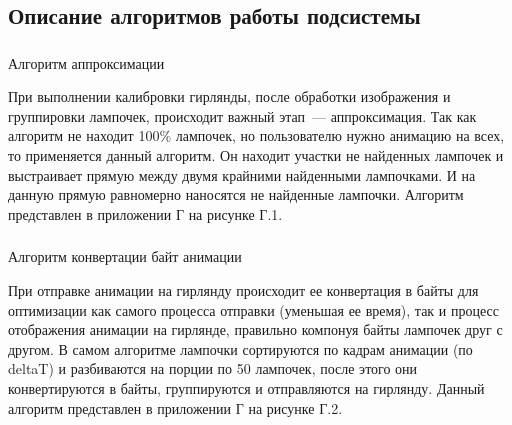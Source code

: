 \newpage
\subsection{Описание алгоритмов работы подсистемы}
\label{sec:develop:algorithms}

\subsubsection{} Алгоритм аппроксимации
\label{sec:develop:algorithms:approximation}

При выполнении калибровки гирлянды, после обработки изображения и группировки лампочек, происходит важный этап~--- аппроксимация. Так как алгоритм не находит 100\% лампочек, но пользователю нужно анимацию на всех, то применяется данный алгоритм. Он находит участки не найденных лампочек и выстраивает прямую между двумя крайними найденными лампочками. И на данную прямую равномерно наносятся не найденные лампочки. Алгоритм представлен в приложении Г на рисунке Г.1.

\subsubsection{} Алгоритм конвертации байт анимации
\label{sec:develop:algorithms:bytesSending}

При отправке анимации на гирлянду происходит ее конвертация в байты для оптимизации как самого процесса отправки (уменьшая ее время), так и процесс отображения анимации на гирлянде, правильно компонуя байты лампочек друг с другом. В самом алгоритме лампочки сортируются по кадрам анимации (по deltaT) и разбиваются на порции по 50 лампочек, после этого они конвертируются в байты, группируются и отправляются на гирлянду. Данный алгоритм представлен в приложении Г на рисунке Г.2.